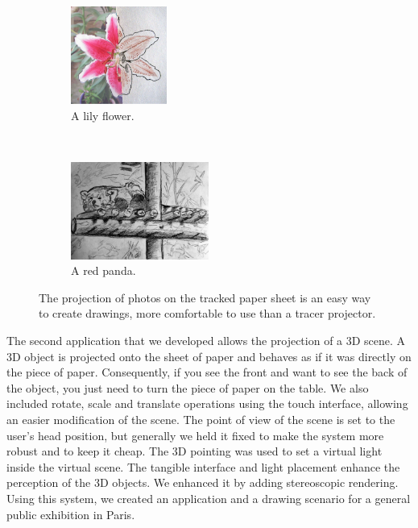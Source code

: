\documentclass{article}
\begin{document}
\begin{figure}[!h]
        \begin{subfigure}[b]{0.20\textwidth}
                \centering
                \includegraphics[height=3.2cm]{lys}
                \caption{A lily flower.}
                \label{fig:lys}
        \end{subfigure}%
        ~ %
        \begin{subfigure}[b]{0.25\textwidth}
                \centering
                \includegraphics[height=3.2cm]{panda}
                \caption{A red panda.}
                \label{fig:panda}
        \end{subfigure}
        \caption{The projection of photos on the tracked paper sheet is an easy way to create drawings, more comfortable to use than a tracer projector.}\label{fig:lyspanda}
\end{figure}


The second application that we developed allows the projection of a 3D scene. A 3D object is projected onto the sheet of paper and behaves as if it was directly on the piece of paper. Consequently, if you see the front and want to see the back of the object, you just need to turn the piece of paper on the table. We also included rotate, scale and translate operations using the touch interface, allowing an easier modification of the scene. 
The point of view of the scene is set to the user's head position, but generally we held it fixed  to make the system more robust and to keep it cheap. The 3D pointing was used to set a virtual light inside the virtual scene. The tangible interface and light placement enhance the perception of the 3D objects. We enhanced it by adding stereoscopic rendering. Using this system, we created an application and a drawing scenario for a general public exhibition in Paris. 
\end{document}
